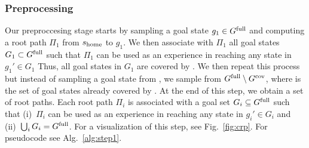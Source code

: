 \documentclass[conference]{IEEEtran}
\begin{document}
\subsubsection{Preprocessing}
Our preproccesing stage starts by sampling a goal state $g_1 \in G^{\textrm{full}}$ and computing a root path $\Pi_1$ from $s_{\textrm{home}}$ to $g_1$. We then associate with $\Pi_1$ all goal states $G_1 \subset G^{\textrm{full}}$ such that $\Pi_1$ can be used as an experience in reaching any state in $g_1' \in G_1$ 
Thus, all goal states in $G_1$ are covered by \Shome.
%
We then repeat this process but instead of sampling  a goal state from \Gfull, we sample from $G^{\textrm{full}} \setminus G^{\textrm{cov}}$, where \Gcov is the set of goal states already covered by \Shome.
At the end of this step, we obtain a set of root paths. 
Each root path $\Pi_i$ is associated with a goal set $G_i \subseteq G^{\textrm{full}}$ such that 
(i)~$\Pi_i$ can be used as an experience in reaching any state in $g_i' \in G_i$ and 
(ii)~$\bigcup_i G_i = G^{\textrm{full}}$.
%
For a visualization of this step, see Fig.~\ref{fig:crp}.
For pseudocode see Alg.~\ref{alg:step1}.
\end{document}
